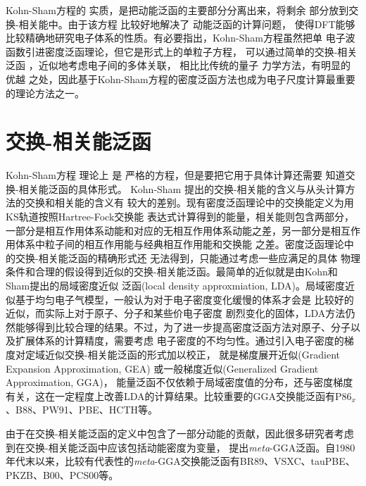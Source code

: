Kohn-Sham方程的%
实质，是把动能泛函的主要部分分离出来，将剩余%
部分放到交换-相关能中。由于该方程%
{比较好地}解决了%
动能泛函的{计算}问题，%
使得DFT能够比较精确地研究电子体系的性质。有必要指出，Kohn-Sham方程虽然把单%
{电}子波函数引进密度泛函理论，但它是{形式上}的单粒子方程，%
可以通过简单的交换-相关泛函%
{，近似地考虑}电子间的多体关联，%
{相比}比传统的量子%
{力}学方法，有明显的%
优越%
{之处}，{因此}基于Kohn-Sham方程的密度泛函方法也成为电子尺度计算最重要的{理论}方法之一。

\section{交换-相关能泛函}
Kohn-Sham方程%
理论上%
是%
严格的方程，但是要把它用于具体计算还需要%
{知道}交换-相关能泛函的具体形式。%
Kohn-Sham%
提出的交换-相关能的含义与从头计算方法的交换和相关能的含义有%
{较}大的差别{。现有}密度泛函理论中的交换能定义为用KS轨道按照Hartree-Fock交换能%
{表达}式计算得到的能量，相关能则包含两部分，一部分是相互作用体系动能和对应的无相互作用体系动能{之}差，另一部分是相互作用体系中粒子间的相互作用能与经典相互作用{能}和交换能%
{之}差。密度泛函{理论}中的交换-相关能泛函的精确形式还%
{无法}得到，只能通过{考虑}一些{应满足的}具体%
物理%
{条件}和合理的假设得到近似的交换-相关能泛函。最简单的近似就是由Kohn和Sham提出的局域密度近似%
{泛函}\cite{PR140-A1133_1965}(local density approxmiation, LDA){。}局域密度近似基于均匀电子气模型，一般认为对于电子密度变化缓慢的体系{才会}是%
比较好的近似，而实际上对于原子、分子和某些价电子密度%
剧烈变化的固体，LDA方法仍然能够得到比较合理的结果。不过，为了进一步提高密度泛函方法对原子、分子以及扩展体系的计算精度，需要考虑%
电子密度的不均匀性。通过引入电子密度的梯度对{定域近似}交换-相关能{泛函}的形式加以校正，%
{就是}梯度展开近似(Gradient Expansion Approximation, GEA)%
{或}一般梯度近似(Generalized Gradient Approximation, GGA)，%
能量泛函不仅依赖于局域密度值的分布，还与密度梯度有关，这在一定程度上改善LDA的计算结果。比较重要的GGA交换能泛函有P86$_x$\cite{PRB33-8800_1986}、B88\cite{PRA38-3098_1988}、PW91\cite{PRB46-6671_1992,PRB48-4978_1993,PRB54-16533_1996,PRB57-14999_1998}、PBE\cite{PRL77-1396_1996,IBID78-1396_1997}、HCTH\cite{JCP109-6264_1998}等。

由于在交换-相关能泛函的定义中包含了一部分动能的贡献，因此很多研究者考虑{到}在交换-相关{能}泛函中应该包括动能密度为变量，%
{提出}\textit{meta}-GGA泛函。自1980年代末以来，比较有代表性的\textit{meta}-GGA交换能泛函有BR89\cite{PRA39-3761_1989}、\linebreak VSXC\cite{JCP109-400_1998}、tauPBE\cite{JCP111-911_1999}、PKZB\cite{PRL82-2544_1999,PRL82-5179_1999}、B00\cite{JCP112-4020_2000}、PCS00\cite{JCP113-10013_2000}等。

